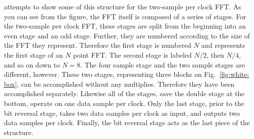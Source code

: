 \documentclass{gqtekspec}
\begin{document}
attempts to show some of this structure for the two-sample per clock FFT.
As you can see from the figure, the
FFT itself is composed of a series of stages.  For the two-sample per clock
FFT, these stages are split from the beginning into an even stage and an odd
stage.  Further, they are numbered
according to the size of the FFT they represent.  Therefore the first stage
is numbered $N$ and represents the first stage of an $N$ point FFT.  The
second stage is labeled $N/2$, then $N/4$, and so on down to $N=8$.  The
four sample stage and the two sample stages are different, however.  These
two stages, representing three blocks on Fig.~\ref{fig:white-box}, can be
accomplished without any multiplies.  Therefore they have been accomplished
separately.  Likewise all of the stages, save the double stage at the bottom,
operate on one data sample per clock.  Only the last stage, prior to the
bit reversal stage, takes two data samples per clock as input, and outputs two 
data samples per clock.  Finally, the bit reversal stage acts as the last
piece of the structure.
\end{document}
